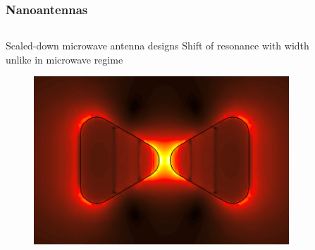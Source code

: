 \documentclass[10pt]{beamer}
\begin{document}
\begin{frame}
    \frametitle{Nanoantennas}

    \begin{columns} %
        \begin{column}{.45\textwidth}
            \begin{minipage}[T][.1\textheight][c]{\linewidth}
                \begin{outline}[itemize]
                    \1 Scaled-down microwave antenna designs
                    \1 Shift of resonance with width unlike in microwave regime
                \end{outline}
                \begin{figure}
                    \includegraphics[scale=.03]{bowtie_field_map.png}
                \end{figure}
            \end{minipage}
        \end{column}
        \begin{column}{.55\textwidth}
            \begin{figure}
                \centering
\end{figure}
\end{column}
\end{columns}
\end{frame}
\end{document}

